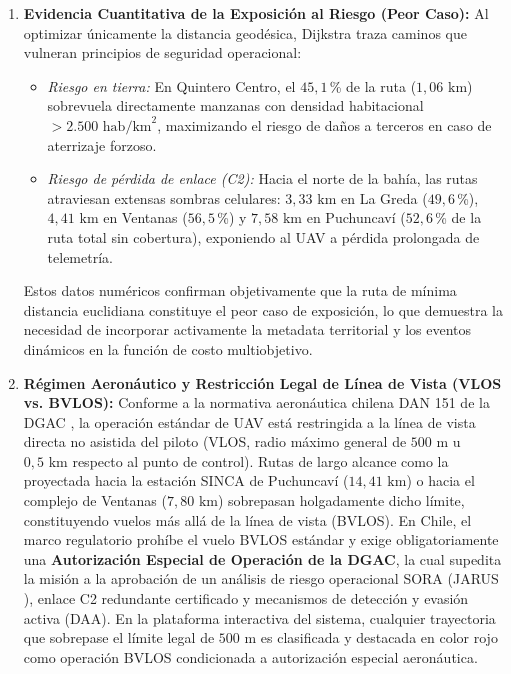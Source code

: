 \documentclass[letterpaper,12pt]{article}
\begin{document}
\begin{enumerate}
    \item \textbf{Evidencia Cuantitativa de la Exposición al Riesgo (Peor Caso):} Al optimizar únicamente la distancia geodésica, Dijkstra traza caminos que vulneran principios de seguridad operacional:
    \begin{itemize}
        \item \textit{Riesgo en tierra:} En Quintero Centro, el $45{,}1$\,\% de la ruta ($1{,}06\text{ km}$) sobrevuela directamente manzanas con densidad habitacional $>2.500\text{ hab/km}^2$, maximizando el riesgo de daños a terceros en caso de aterrizaje forzoso.
        \item \textit{Riesgo de pérdida de enlace (C2):} Hacia el norte de la bahía, las rutas atraviesan extensas sombras celulares: $3{,}33\text{ km}$ en La Greda ($49{,}6$\,\%), $4{,}41\text{ km}$ en Ventanas ($56{,}5$\,\%) y $7{,}58\text{ km}$ en Puchuncaví ($52{,}6$\,\% de la ruta total sin cobertura), exponiendo al UAV a pérdida prolongada de telemetría.
    \end{itemize}
    Estos datos numéricos confirman objetivamente que la ruta de mínima distancia euclidiana constituye el peor caso de exposición, lo que demuestra la necesidad de incorporar activamente la metadata territorial y los eventos dinámicos en la función de costo multiobjetivo.

    \item \textbf{Régimen Aeronáutico y Restricción Legal de Línea de Vista (VLOS vs. BVLOS):} Conforme a la normativa aeronáutica chilena DAN 151 de la DGAC \cite{dan151}, la operación estándar de UAV está restringida a la línea de vista directa no asistida del piloto (VLOS, radio máximo general de $500\text{ m}$ u $0{,}5\text{ km}$ respecto al punto de control). Rutas de largo alcance como la proyectada hacia la estación SINCA de Puchuncaví ($14{,}41\text{ km}$) o hacia el complejo de Ventanas ($7{,}80\text{ km}$) sobrepasan holgadamente dicho límite, constituyendo vuelos más allá de la línea de vista (BVLOS). En Chile, el marco regulatorio prohíbe el vuelo BVLOS estándar y exige obligatoriamente una \textbf{Autorización Especial de Operación de la DGAC}, la cual supedita la misión a la aprobación de un análisis de riesgo operacional SORA (JARUS \cite{sora}), enlace C2 redundante certificado y mecanismos de detección y evasión activa (DAA). En la plataforma interactiva del sistema, cualquier trayectoria que sobrepase el límite legal de $500\text{ m}$ es clasificada y destacada en color rojo como operación BVLOS condicionada a autorización especial aeronáutica.


\end{enumerate}
\end{document}
